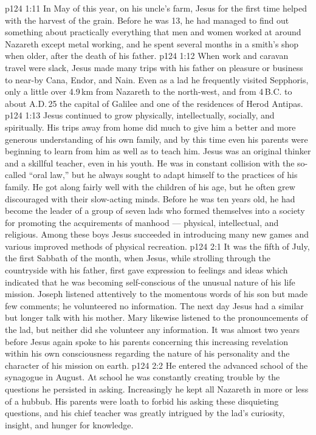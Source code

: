 \vs p124 1:11 \pc In May of this year, on his uncle’s farm, Jesus for the first time helped with the harvest of the grain. Before he was 13, he had managed to find out something about practically everything that men and women worked at around Nazareth except metal working, and he spent several months in a smith’s shop when older, after the death of his father.
\vs p124 1:12 When work and caravan travel were slack, Jesus made many trips with his father on pleasure or business to near\hyp{}by Cana, Endor, and Nain. Even as a lad he frequently visited Sepphoris, only a little over 4.9\,km from Nazareth to the north\hyp{}west, and from 4\,B.C. to about A.D.\,25 the capital of Galilee and one of the residences of Herod Antipas.
\vs p124 1:13 Jesus continued to grow physically, intellectually, socially, and spiritually. His trips away from home did much to give him a better and more generous understanding of his own family, and by this time even his parents were beginning to learn from him as well as to teach him. Jesus was an original thinker and a skillful teacher, even in his youth. He was in constant collision with the so\hyp{}called “oral law,” but he always sought to adapt himself to the practices of his family. He got along fairly well with the children of his age, but he often grew discouraged with their slow\hyp{}acting minds. Before he was ten years old, he had become the leader of a group of seven lads who formed themselves into a society for promoting the acquirements of manhood --- physical, intellectual, and religious. Among these boys Jesus succeeded in introducing many new games and various improved methods of physical recreation.
\vs p124 2:1 It was the fifth of July, the first Sabbath of the month, when Jesus, while strolling through the countryside with his father, first gave expression to feelings and ideas which indicated that he was becoming self\hyp{}conscious of the unusual nature of his life mission. Joseph listened attentively to the momentous words of his son but made few comments; he volunteered no information. The next day Jesus had a similar but longer talk with his mother. Mary likewise listened to the pronouncements of the lad, but neither did she volunteer any information. It was almost two years before Jesus again spoke to his parents concerning this increasing revelation within his own consciousness regarding the nature of his personality and the character of his mission on earth.
\vs p124 2:2 \pc He entered the advanced school of the synagogue in August. At school he was constantly creating trouble by the questions he persisted in asking. Increasingly he kept all Nazareth in more or less of a hubbub. His parents were loath to forbid his asking these disquieting questions, and his chief teacher was greatly intrigued by the lad’s curiosity, insight, and hunger for knowledge.
